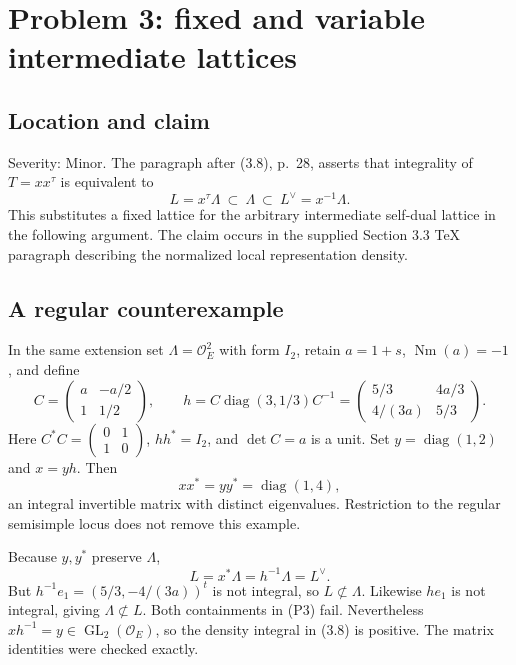 \documentclass[10pt]{article}
\begin{document}
\section*{Problem 3: fixed and variable intermediate lattices}
\subsection*{Location and claim}
Severity: Minor. The paragraph after (3.8), p. 28, asserts that integrality of \(T=xx^\tau\) is equivalent to \[L=x^\tau\Lambda\ \subset\ \Lambda\ \subset\
 L^\vee=x^{-1}\Lambda. \tag{P3}\] This substitutes a fixed lattice for the arbitrary intermediate self-dual lattice in the following argument. The claim occurs in the supplied Section 3.3 TeX paragraph describing the normalized local representation density.\par
\subsection*{A regular counterexample}
In the same extension set \(\Lambda=\mathcal O_E^2\) with form \(I_2\), retain \(a=1+s\), \(\operatorname{Nm}(a)=-1\), and define \[C=\begin{pmatrix}a&-a/2\\1&1/2\end{pmatrix},\qquad
 h=C\operatorname{diag}(3,1/3)C^{-1}
  =\begin{pmatrix}5/3&4a/3\\4/(3a)&5/3\end{pmatrix}.\] Here \(C^*C=\left(\begin{smallmatrix}0&1\\1&0\end{smallmatrix}\right)\), \(hh^*=I_2\), and \(\det C=a\) is a unit. Set \(y=\operatorname{diag}(1,2)\) and \(x=yh\). Then \[xx^*=yy^*=\operatorname{diag}(1,4),\] an integral invertible matrix with distinct eigenvalues. Restriction to the regular semisimple locus does not remove this example.\par
Because \(y,y^*\) preserve \(\Lambda\), \[L=x^*\Lambda=h^{-1}\Lambda=L^\vee.\] But \(h^{-1}e_1=(5/3,-4/(3a))^t\) is not integral, so \(L\not\subset\Lambda\). Likewise \(he_1\) is not integral, giving \(\Lambda\not\subset L\). Both containments in (P3) fail. Nevertheless \(xh^{-1}=y\in\operatorname{GL}_2(\mathcal O_E)\), so the density integral in (3.8) is positive. The matrix identities were checked exactly.\par
\end{document}
